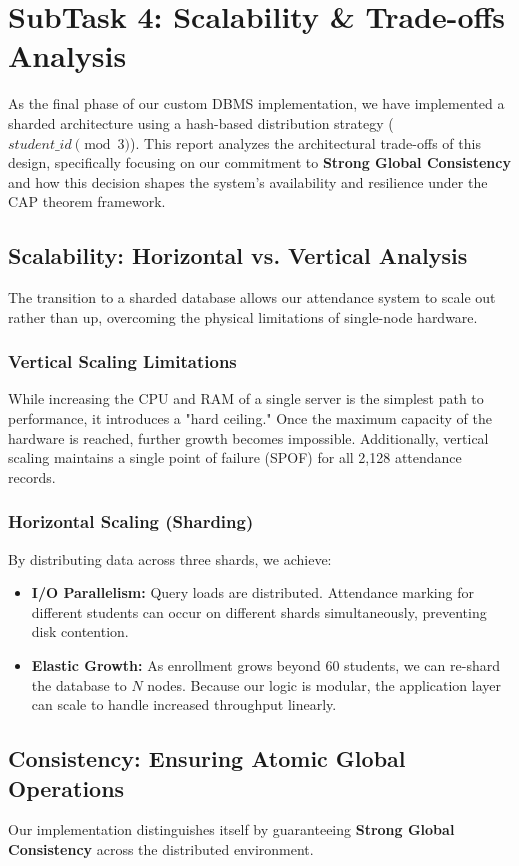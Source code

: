 \documentclass[conference]{IEEEtran}
\begin{document}
\section{SubTask 4: Scalability \& Trade-offs Analysis}
As the final phase of our custom DBMS implementation, we have implemented a sharded architecture using a hash-based distribution strategy ($student\_id \pmod 3$). This report analyzes the architectural trade-offs of this design, specifically focusing on our commitment to \textbf{Strong Global Consistency} and how this decision shapes the system's availability and resilience under the CAP theorem framework.

\subsection{Scalability: Horizontal vs. Vertical Analysis}
The transition to a sharded database allows our attendance system to scale out rather than up, overcoming the physical limitations of single-node hardware.

\subsubsection{Vertical Scaling Limitations}
While increasing the CPU and RAM of a single server is the simplest path to performance, it introduces a "hard ceiling." Once the maximum capacity of the hardware is reached, further growth becomes impossible. Additionally, vertical scaling maintains a single point of failure (SPOF) for all 2,128 attendance records.

\subsubsection{Horizontal Scaling (Sharding)}
By distributing data across three shards, we achieve:
\begin{itemize}
    \item \textbf{I/O Parallelism:} Query loads are distributed. Attendance marking for different students can occur on different shards simultaneously, preventing disk contention.
    \item \textbf{Elastic Growth:} As enrollment grows beyond 60 students, we can re-shard the database to $N$ nodes. Because our logic is modular, the application layer can scale to handle increased throughput linearly.
\end{itemize}

\subsection{Consistency: Ensuring Atomic Global Operations}
Our implementation distinguishes itself by guaranteeing \textbf{Strong Global Consistency} across the distributed environment.
\end{document}
